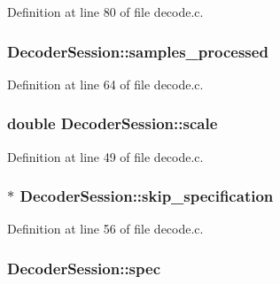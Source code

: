Definition at line 80 of file decode.\+c.

\subsubsection[{\texorpdfstring{samples\+\_\+processed}{samples_processed}}]{ Decoder\+Session\+::samples\+\_\+processed}\hypertarget{struct_decoder_session_a5c1a39de00d6fb941e92e67a8c83ee9f}{}\label{struct_decoder_session_a5c1a39de00d6fb941e92e67a8c83ee9f}


Definition at line 64 of file decode.\+c.

\subsubsection[{\texorpdfstring{scale}{scale}}]{\setlength{\rightskip}{0pt plus 5cm}double Decoder\+Session\+::scale}\hypertarget{struct_decoder_session_a71c4b87d28f34f9e3d52a7629643e99e}{}\label{struct_decoder_session_a71c4b87d28f34f9e3d52a7629643e99e}


Definition at line 49 of file decode.\+c.

\subsubsection[{\texorpdfstring{skip\+\_\+specification}{skip_specification}}]{$\ast$ Decoder\+Session\+::skip\+\_\+specification}\hypertarget{struct_decoder_session_aad06b0ffa3a3a9cdfc92dad48ff41860}{}\label{struct_decoder_session_aad06b0ffa3a3a9cdfc92dad48ff41860}


Definition at line 56 of file decode.\+c.

\subsubsection[{\texorpdfstring{spec}{spec}}]{ Decoder\+Session\+::spec}\hypertarget{struct_decoder_session_a0babfed5783706c8cd54ce3cc9e6b491}{}\label{struct_decoder_session_a0babfed5783706c8cd54ce3cc9e6b491}



